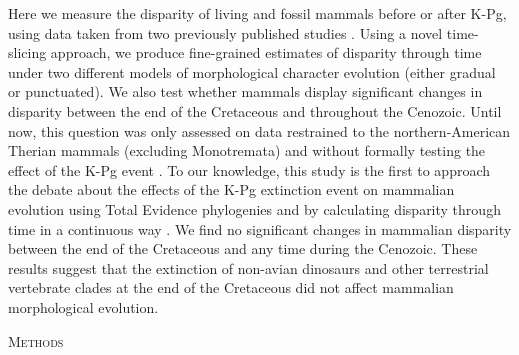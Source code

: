 \documentclass[12pt,letterpaper]{article}
\renewcommand{\section}[1]{%
\bigskip
\begin{center}
\begin{Large}
\normalfont\scshape #1
\medskip
\end{Large}
\end{center}}
\begin{document}
Here we measure the disparity of living and fossil mammals before or after K-Pg, using data taken from two previously published studies \citep{Slater2012MEE,beckancient2014}. 
Using a novel time-slicing approach, we produce fine-grained estimates of disparity through time under two different models of morphological character evolution (either gradual or punctuated). 
We also test whether mammals display significant changes in disparity between the end of the Cretaceous and throughout the Cenozoic.
Until now, this question was only assessed on data restrained to the northern-American Therian mammals (excluding Monotremata) and without formally testing the effect of the K-Pg event \citep{Wilson2013}.
To our knowledge, this study is the first to approach the debate about the effects of the K-Pg extinction event on mammalian evolution using Total Evidence phylogenies and by calculating disparity through time in a continuous way \citep[but see][for a similar question]{halliday2013testing}.
We find no significant changes in mammalian disparity between the end of the Cretaceous and any time during the Cenozoic.
These results suggest that the extinction of non-avian dinosaurs and other terrestrial vertebrate clades at the end of the Cretaceous did not affect mammalian morphological evolution.

%
%

\section{Methods}
\end{document}

